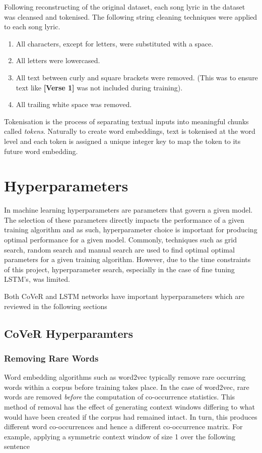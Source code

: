 \noindent
\newline
Following reconstructing of the original dataset, each song lyric in the dataset was cleansed and tokenised. The following string cleaning techniques were applied to each song lyric.

\begin{enumerate}
	\item All characters, except for letters, were substituted with a space.
	\item All letters were lowercased.
	\item All text between curly and square brackets were removed. (This was to ensure text like \textbf{[Verse 1]} was not included during training).
	\item All trailing white space was removed.
\end{enumerate}

\noindent
\newline
Tokenisation is the process of separating textual inputs into meaningful chunks called \textit{tokens}. Naturally to create word embeddings, text is tokenised at the word level and each token is assigned a unique integer key to map the token to its future word embedding.

\section{Hyperparameters}
In machine learning hyperparameters are parameters that govern a given model. The selection of these parameters directly impacts the performance of a given training algorithm and as such, hyperparameter choice is important for producing optimal performance for a given model. Commonly, techniques such as grid search, random search and manual search are used to find optimal optimal parameters for a given training algorithm. However, due to the time constraints of this project, hyperparameter search, especially in the case of fine tuning LSTM's, was limited.

\noindent
\newline
Both CoVeR and LSTM networks have important hyperparameters which are reviewed in the following sections
\subsection{CoVeR Hyperparamters}
\subsubsection{Removing Rare Words}
Word embedding algorithms such as word2vec typically remove rare occurring words within a corpus before training takes place. In the case of word2vec, rare words are removed \textit{before} the computation of co-occurrence statistics. This method of removal has the effect of generating context windows differing to what would have been created if the corpus had remained intact. In turn, this produces different word co-occurrences and hence a different co-occurrence matrix. For example, applying a symmetric context window of size 1 over the following sentence

